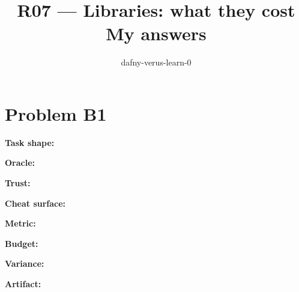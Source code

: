 \documentclass[11pt]{article}
\title{R07 --- Libraries: what they cost \\ \large My answers}
\author{dafny-verus-learn-0}
\date{}
\begin{document}
\maketitle
\section*{Problem B1}\label{ans:B1}
\begin{answer}
\textbf{Task shape:} \vspace{2cm}

\textbf{Oracle:} \vspace{2cm}

\textbf{Trust:} \vspace{2cm}

\textbf{Cheat surface:} \vspace{2cm}

\textbf{Metric:} \vspace{2cm}

\textbf{Budget:} \vspace{2cm}

\textbf{Variance:} \vspace{2cm}

\textbf{Artifact:} \vspace{2cm}
\end{answer}
\end{document}
